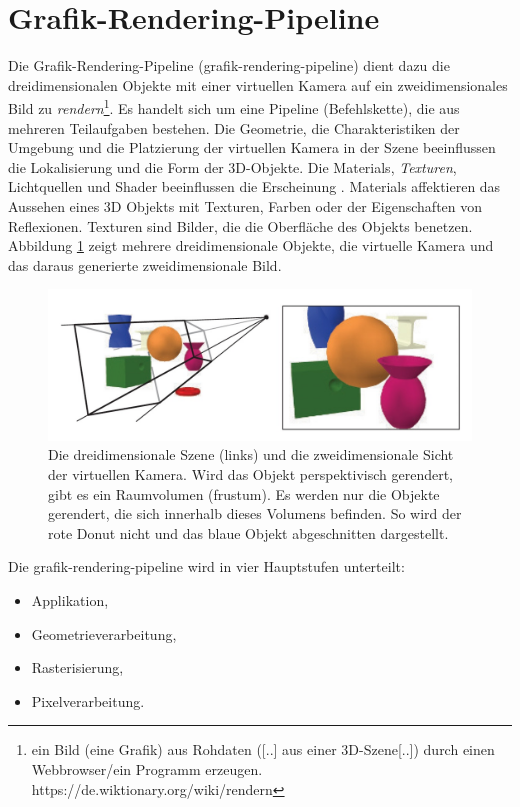 \section{Grafik-Rendering-Pipeline}
\label{grp-rendering-pipeline}
Die Grafik-Rendering-Pipeline (\acrshort{grafik-rendering-pipeline}) dient dazu die dreidimensionalen Objekte mit einer virtuellen Kamera auf ein zweidimensionales Bild zu \textit{rendern}\footnote{\glqq ein Bild (eine Grafik) aus Rohdaten ([..] aus einer 3D-Szene[..]) durch einen Webbrowser/ein Programm erzeugen.\grqq{} https://de.wiktionary.org/wiki/rendern}.
Es handelt sich um eine Pipeline (Befehlskette), die aus mehreren Teilaufgaben bestehen. Die Geometrie, die Charakteristiken der Umgebung und die Platzierung der virtuellen Kamera in der Szene beeinflussen die Lokalisierung und die Form der 3D-Objekte. Die \acrshort{Materials}, \textit{Texturen}, Lichtquellen und Shader beeinflussen die Erscheinung \cite*[Moeller (2019)]{moeller2019}. Materials affektieren das Aussehen eines 3D Objekts mit Texturen, Farben oder der Eigenschaften von Reflexionen. Texturen sind Bilder, die die Oberfläche des Objekts benetzen. Abbildung \ref*{fig:renderpipeline1} zeigt mehrere dreidimensionale Objekte, die virtuelle Kamera und das daraus generierte zweidimensionale Bild. 

\begin{figure}[h]
    \centering
    \includegraphics[width=\textwidth]{img/Render/render_pipeline_1.jpg}
    \caption{Die dreidimensionale Szene (links) und die zweidimensionale Sicht der virtuellen Kamera. Wird das Objekt perspektivisch gerendert, gibt es ein Raumvolumen (frustum). Es werden nur die Objekte gerendert, die sich innerhalb dieses Volumens befinden. So wird der rote Donut nicht und das blaue Objekt abgeschnitten dargestellt\cite*[Moeller (2019)]{moeller2019}.}
    \label{fig:renderpipeline1}
\end{figure}

Die \acrshort{grafik-rendering-pipeline} wird in vier Hauptstufen unterteilt: 

\begin{itemize}
    \item Applikation,
    \item Geometrieverarbeitung,
    \item Rasterisierung,
    \item Pixelverarbeitung.
  \end{itemize}


